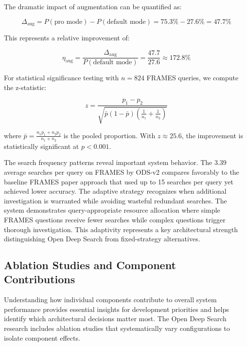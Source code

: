 The dramatic impact of augmentation can be quantified as:

\begin{equation}
\Delta_{\text{aug}} = P(\text{pro mode}) - P(\text{default mode}) = 75.3\% - 27.6\% = 47.7\%
\label{eq:augmentation_gain}
\end{equation}

This represents a relative improvement of:

\begin{equation}
\eta_{\text{aug}} = \frac{\Delta_{\text{aug}}}{P(\text{default mode})} = \frac{47.7}{27.6} \approx 172.8\%
\label{eq:relative_augmentation}
\end{equation}

For statistical significance testing with $n = 824$ FRAMES queries, we compute the z-statistic:

\begin{equation}
z = \frac{p_1 - p_2}{\sqrt{\bar{p}(1-\bar{p})\left(\frac{1}{n_1} + \frac{1}{n_2}\right)}}
\label{eq:z_statistic}
\end{equation}

where $\bar{p} = \frac{n_1 p_1 + n_2 p_2}{n_1 + n_2}$ is the pooled proportion. With $z \approx 25.6$, the improvement is statistically significant at $p < 0.001$.

The search frequency patterns reveal important system behavior. The 3.39 average searches per query on FRAMES by ODS-v2 compares favorably to the baseline FRAMES paper approach that used up to 15 searches per query yet achieved lower accuracy. The adaptive strategy recognizes when additional investigation is warranted while avoiding wasteful redundant searches. The system demonstrates query-appropriate resource allocation where simple FRAMES questions receive fewer searches while complex questions trigger thorough investigation. This adaptivity represents a key architectural strength distinguishing Open Deep Search from fixed-strategy alternatives.

\subsection{Ablation Studies and Component Contributions}

Understanding how individual components contribute to overall system performance provides essential insights for development priorities and helps identify which architectural decisions matter most. The Open Deep Search research includes ablation studies that systematically vary configurations to isolate component effects.

